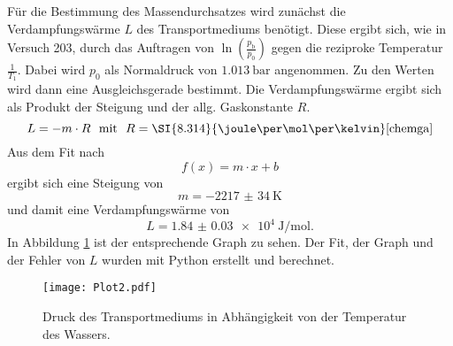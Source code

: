 \documentclass[
  bibliography=totoc,     %
  captions=tableheading,  %
  titlepage=firstiscover, %
]{scrartcl}
\begin{document}
Für die Bestimmung des Massendurchsatzes wird zunächst die Verdampfungswärme $L$
des Transportmediums benötigt.
Diese ergibt sich, wie in Versuch 203, durch das Auftragen von $\ln \left( \frac{p_\mathup{b}}{p_0} \right)$
gegen die reziproke Temperatur $\frac{1}{T_1}$. Dabei wird $p_0$ als Normaldruck von $\SI{1.013}{\bar}$
angenommen. Zu den Werten wird dann eine Ausgleichsgerade bestimmt.
Die Verdampfungswärme ergibt sich als Produkt der Steigung und der allg.
Gaskonstante $R$.
\begin{equation}
  L = - m \cdot R \,\,\,\, \text{mit} \,\,\,\, R = \SI{8.314}{\joule\per\mol\per\kelvin}  \text{\cite{chemga}}
\end{equation}
Aus dem Fit nach
\begin{equation}
  f(x) = m \cdot x + b
\end{equation}
ergibt sich eine Steigung von
\begin{equation}
  m = \SI{-2217(34)}{\kelvin}
\end{equation}
und damit eine Verdampfungswärme von
\begin{equation}
  L = \SI{1.84(3)e4}{\joule\per\mol}.
\end{equation}
In Abbildung \ref{fig:plot2} ist der entsprechende Graph zu sehen.
Der Fit, der Graph und der Fehler von $L$ wurden mit Python erstellt und berechnet.
\begin{figure}[htb]
  \centering
  \texttt{[image: Plot2.pdf]}
  \caption{Druck des Transportmediums in Abhängigkeit von der Temperatur des Wassers.}
  \label{fig:plot2}
\end{figure}
\end{document}
